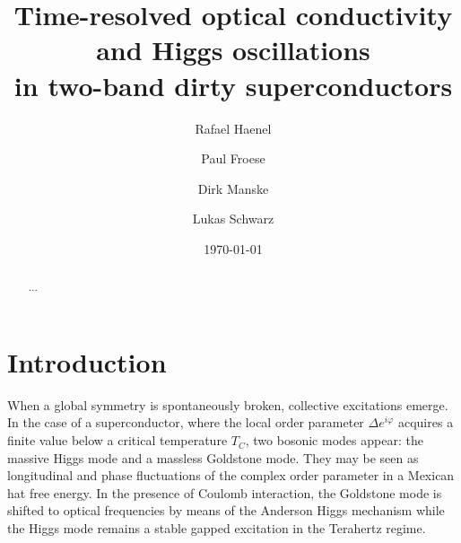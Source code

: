 \documentclass[aps,prb,reprint,noeprint,superscriptaddress]{revtex4-1}
\begin{document}
\title{Time-resolved optical conductivity and Higgs oscillations\\in two-band dirty superconductors}

\author{Rafael Haenel}

\author{Paul Froese}


\author{Dirk Manske}

\author{Lukas Schwarz}


\date{\today}

\begin{abstract}
...
\end{abstract}




\maketitle


\section{Introduction}
\label{sec:introduction}

When a global symmetry is spontaneously broken, collective excitations emerge.
In the case of a superconductor, where the local order parameter $\Delta
e^{i\varphi}$ acquires a
finite value below a critical temperature $T_C$, two bosonic modes appear: the
massive Higgs mode and a massless Goldstone mode. They may be seen as
longitudinal and phase fluctuations of the complex order parameter in a Mexican
hat free energy. In the presence of Coulomb interaction, the Goldstone mode is
shifted to optical frequencies
by means of the Anderson Higgs mechanism while the Higgs mode remains
a stable gapped excitation in the Terahertz regime.
\end{document}
